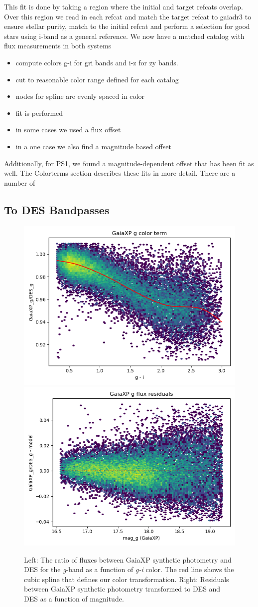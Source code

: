 This fit is done by taking a region where the initial and target refcats overlap. 
Over this region we read in each refcat and match the target refcat to gaiadr3 to ensure stellar purity, match to the initial refcat and perform a selection for good stars using i-band as a general reference.
We now have a matched catalog with flux measurements in both systems

\begin{itemize}
\item compute colors g-i for gri bands and i-z for zy bands. 
\item cut to reasonable color range defined for each catalog 
\item nodes for spline are evenly spaced in color 
\item fit is performed 
\item in some cases we used a flux offset
\item in a one case we also find a magnitude based offset
\end{itemize}
Additionally, for PS1, we found a magnitude-dependent offset that has been fit as well. The Colorterms section describes these fits in more detail.
There are a number of
\subsection{To DES Bandpasses}
\label{sec:todes}
\begin{figure}
    \includegraphics[width=0.49\linewidth]{./figures/color_terms/GaiaXP_to_DES_band_g_color_term.png}
    \includegraphics[width=0.49\linewidth]{./figures/color_terms/GaiaXP_to_DES_band_g_flux_residuals.png}
    \caption{Left: The ratio of fluxes between GaiaXP synthetic photometry and DES for the \textit{g}-band as a function of \textit{g-i} color. The red line shows the cubic spline that defines our color transformation.
    Right: Residuals between GaiaXP synthetic photometry transformed to DES and DES as a function of magnitude.}
    \label{fig:color-xp-g}
\end{figure}
